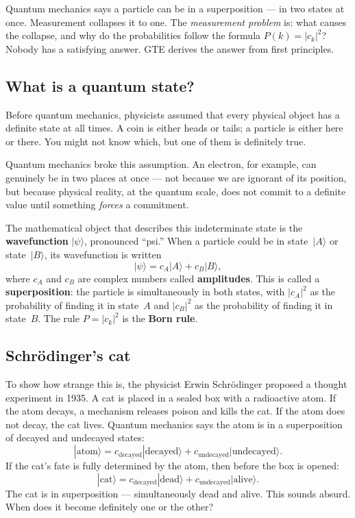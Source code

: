 \documentclass[11pt,a4paper]{article}
\newcommand{\term}[1]{\textbf{#1}}
\begin{document}
\begin{tcolorbox}[colback=boxblue,colframe=blue!40!black,title=The one-line version]
Quantum mechanics says a particle can be in a superposition --- in two states at once.
Measurement collapses it to one.  The \emph{measurement problem} is: what causes the
collapse, and why do the probabilities follow the formula $P(k) = |c_k|^2$?
Nobody has a satisfying answer.  GTE derives the answer from first principles.
\end{tcolorbox}

\subsection{What is a quantum state?}

Before quantum mechanics, physicists assumed that every physical object has a definite
state at all times.  A coin is either heads or tails; a particle is either here or there.
You might not know which, but one of them is definitely true.

Quantum mechanics broke this assumption.  An electron, for example, can genuinely be
in two places at once --- not because we are ignorant of its position, but because
physical reality, at the quantum scale, does not commit to a definite value until
something \emph{forces} a commitment.

The mathematical object that describes this indeterminate state is the
\term{wavefunction} $|\psi\rangle$, pronounced ``psi.''  When a particle could be in
state~$|A\rangle$ or state~$|B\rangle$, its wavefunction is written
\[
  |\psi\rangle = c_A |A\rangle + c_B |B\rangle,
\]
where $c_A$ and $c_B$ are complex numbers called \term{amplitudes}.  This is called a
\term{superposition}: the particle is simultaneously in both states, with $|c_A|^2$
as the probability of finding it in state~$A$ and $|c_B|^2$ as the probability of
finding it in state~$B$.  The rule $P = |c_k|^2$ is the \term{Born rule}.

\subsection{Schr\"{o}dinger's cat}

To show how strange this is, the physicist Erwin Schr\"{o}dinger proposed a thought
experiment in 1935.  A cat is placed in a sealed box with a radioactive atom.
If the atom decays, a mechanism releases poison and kills the cat.  If the atom does
not decay, the cat lives.  Quantum mechanics says the atom is in a superposition of
decayed and undecayed states:
\[
  |\text{atom}\rangle = c_{\mathrm{decayed}}|\text{decayed}\rangle +
  c_{\mathrm{undecayed}}|\text{undecayed}\rangle.
\]
If the cat's fate is fully determined by the atom, then before the box is opened:
\[
  |\text{cat}\rangle = c_{\mathrm{decayed}}|\text{dead}\rangle +
  c_{\mathrm{undecayed}}|\text{alive}\rangle.
\]
The cat is in superposition --- simultaneously dead and alive.  This sounds absurd.
When does it become definitely one or the other?
\end{document}
